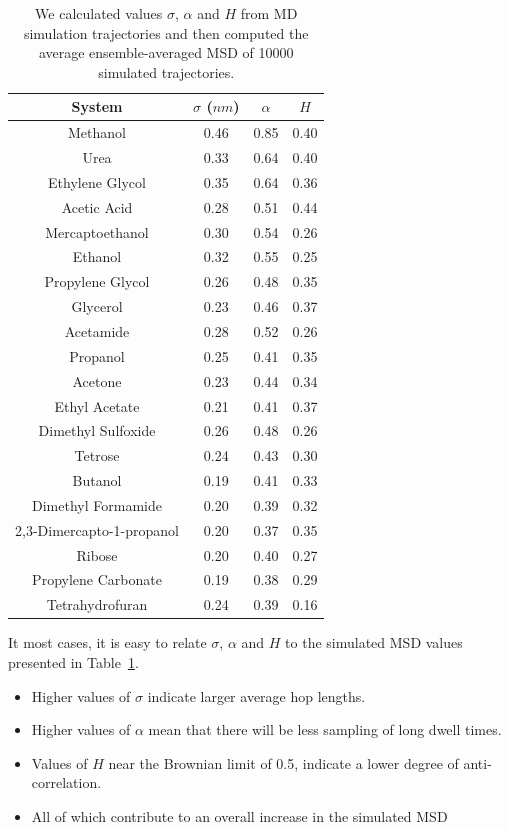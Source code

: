 \documentclass{article}
\begin{document}
  \begin{table}[h]
  \centering
  \begin{tabular}{cccc}
  \toprule
  System & $\sigma$ ($nm$) & $\alpha$ & $H$ \\
  \midrule
  Methanol & 0.46 & 0.85 & 0.40 \\
  Urea & 0.33 & 0.64 & 0.40 \\
  Ethylene Glycol & 0.35 & 0.64 & 0.36 \\
  Acetic Acid & 0.28 & 0.51 & 0.44 \\
  Mercaptoethanol & 0.30 & 0.54 & 0.26 \\
  Ethanol & 0.32 & 0.55 & 0.25 \\
  Propylene Glycol & 0.26 & 0.48 & 0.35 \\
  Glycerol & 0.23 & 0.46 & 0.37 \\
  Acetamide & 0.28 & 0.52 & 0.26 \\
  Propanol & 0.25 & 0.41 & 0.35 \\
  Acetone & 0.23 & 0.44 & 0.34 \\
  Ethyl Acetate & 0.21 & 0.41 & 0.37 \\
  Dimethyl Sulfoxide & 0.26 & 0.48 & 0.26 \\
  Tetrose & 0.24 & 0.43 & 0.30 \\
  Butanol & 0.19 & 0.41 & 0.33 \\
  Dimethyl Formamide & 0.20 & 0.39 & 0.32 \\
  2,3-Dimercapto-1-propanol & 0.20 & 0.37 & 0.35 \\
  Ribose & 0.20 & 0.40 & 0.27 \\
  Propylene Carbonate & 0.19 & 0.38 & 0.29 \\
  Tetrahydrofuran & 0.24 & 0.39 & 0.16 \\
  \bottomrule
  \end{tabular}
  \caption{We calculated values $\sigma$, $\alpha$ and $H$ from MD simulation
  trajectories and then computed the average ensemble-averaged MSD of 10000 
  simulated trajectories.}\label{table:simulations}
  \end{table}
  
  It most cases, it is easy to relate $\sigma$, $\alpha$ and $H$ to the
  simulated MSD values presented in Table~\ref{table:simulations}. 
  \begin{itemize}
  	\item Higher values of $\sigma$ indicate larger average hop lengths.
  	\item Higher values of $\alpha$ mean that there will be less sampling of 
  	long dwell times.
  	\item Values of $H$ near the Brownian limit of 0.5, indicate a lower degree
  	of anti-correlation.
  	\item All of which contribute to an overall increase in the simulated MSD
  \end{itemize}
\end{document}
